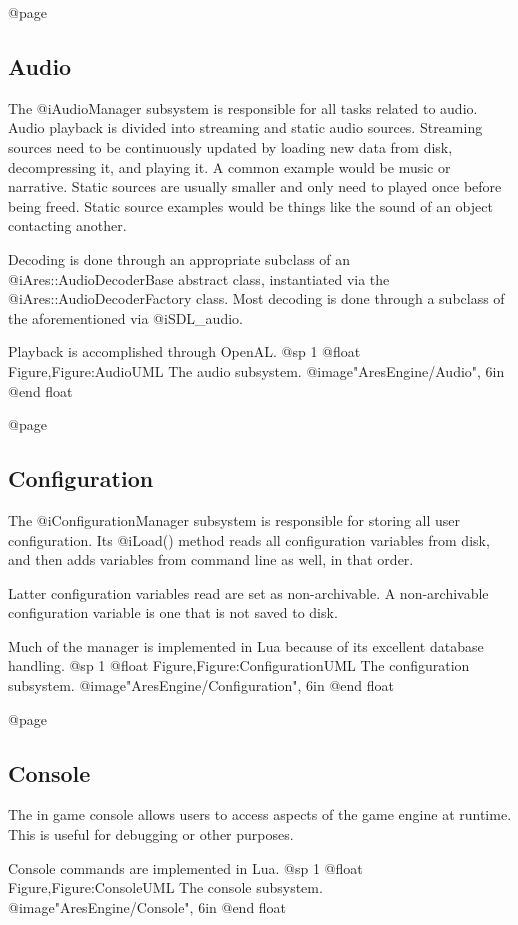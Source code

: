 @page
\subsection{Audio}
The @i{AudioManager} subsystem is responsible for all tasks related to audio. Audio playback is divided into streaming and static audio sources. Streaming sources need to be continuously updated by loading new data from disk, decompressing it, and playing it. A common example would be music or narrative. Static sources are usually smaller and only need to played once before being freed. Static source examples would be things like the sound of an object contacting another.

Decoding is done through an appropriate subclass of an @i{Ares::AudioDecoderBase} abstract class, instantiated via the @i{Ares::AudioDecoderFactory} class. Most decoding is done through a subclass of the aforementioned via @i{SDL_audio}.

Playback is accomplished through OpenAL.
@sp 1
@float Figure,Figure:AudioUML
The audio subsystem.
@image{"AresEngine/Audio", 6in}
@end float

@page
\subsection{Configuration}
The @i{ConfigurationManager} subsystem is responsible for storing all user configuration. Its @i{Load()} method reads all configuration variables from disk, and then adds variables from command line as well, in that order. 

Latter configuration variables read are set as non-archivable. A non-archivable configuration variable is one that is not saved to disk.

Much of the manager is implemented in Lua because of its excellent database handling.
@sp 1
@float Figure,Figure:ConfigurationUML
The configuration subsystem.
@image{"AresEngine/Configuration", 6in}
@end float

@page
\subsection{Console}
The in game console allows users to access aspects of the game engine at runtime. This is useful for debugging or other purposes.

Console commands are implemented in Lua.
@sp 1
@float Figure,Figure:ConsoleUML
The console subsystem.
@image{"AresEngine/Console", 6in}
@end float

